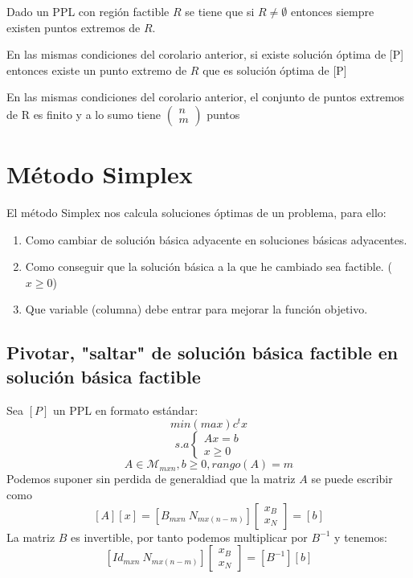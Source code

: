\documentclass[11pt,fleqn]{book} %
\begin{document}
\begin{corollary}
	Dado un PPL con región factible $R$ se tiene que si $R \neq \emptyset$ entonces siempre existen puntos extremos de $R$.
\end{corollary}
\begin{corollary}
En las mismas condiciones del corolario anterior, si existe solución óptima de [P] entonces existe un punto extremo de $R$ que es solución óptima de [P]
\end{corollary}
\begin{corollary}
	En las mismas condiciones del corolario anterior, el conjunto de puntos extremos de R es finito y a lo sumo tiene $\left(\begin{array}{c}
	n \\ m
	\end{array}\right)$ puntos
\end{corollary}

\section{Método Simplex}
El método Simplex nos calcula soluciones óptimas de un problema, para ello:
\begin{enumerate}
	\item Como cambiar de solución básica adyacente en soluciones básicas adyacentes.
	\item Como conseguir que la solución básica a la que he cambiado sea factible. ($x \geq 0$)
	\item Que variable (columna) debe entrar para mejorar la función objetivo.
\end{enumerate}
\subsection{Pivotar, "saltar" de solución básica factible en solución básica factible}
Sea $[P]$ un PPL en formato estándar:
$$ min(max) c^t x$$
$$
s.a \left\{\begin{array}{c}
Ax=b \\
x \geq 0
\end{array}\right.
$$
$$ A \in \mathcal{M}_{mxn}, b\geq 0, rango(A)=m$$
Podemos suponer sin perdida de generaldiad que la matriz $A$ se puede escribir como $$[A][x]=[B_{mxn} ~ N_{mx(n-m)}]\left[\begin{array}{c}
x_B \\
x_N
\end{array}\right]=[b]$$
La matriz $B$ es invertible, por tanto podemos multiplicar por $B^{-1}$ y tenemos:
$$[Id_{mxn} ~ N_{mx(n-m)}]\left[\begin{array}{c}
x_B \\
x_N
\end{array}\right]=[B^{-1}][b]$$
\end{document}
